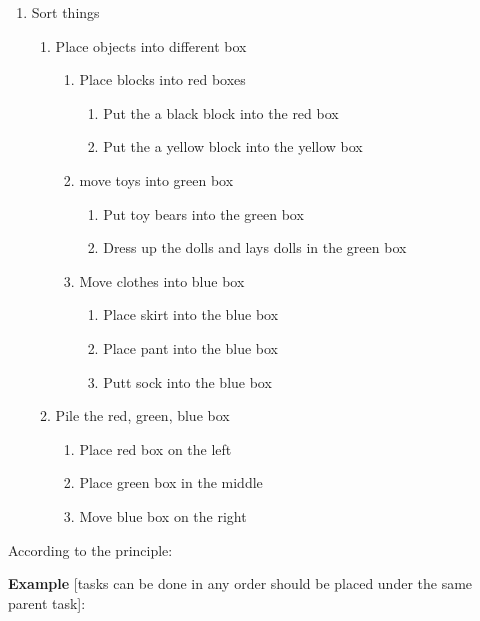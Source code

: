 \documentclass{article}
\begin{document}
\begin{enumerate}
    \item Sort things 
    \begin{enumerate}
    \item  Place objects into different box
    \begin{enumerate}
        \item Place blocks into red boxes 
        \begin{enumerate}
            \item Put the a black block into the red box
            \item Put the a yellow block into the yellow box 
        \end{enumerate}
        \item move toys into green box 
        \begin{enumerate}
            \item Put toy bears into the green box
            \item Dress up the dolls and lays dolls in the green box
        \end{enumerate}
        \item Move clothes into blue box
        \begin{enumerate}
            \item Place skirt into the blue box
            \item Place pant into the blue box
            \item Putt sock into the blue box 
        \end{enumerate}
    \end{enumerate}
    \item  Pile the red, green, blue box
    \begin{enumerate}
        \item Place red box on the left
        \item Place green box in the middle
        \item Move blue box on the right
    \end{enumerate}
    \end{enumerate}
\end{enumerate}

According to the principle:

\textbf{Example} [tasks can be done in any order should be placed under the same parent task]:
\end{document}
